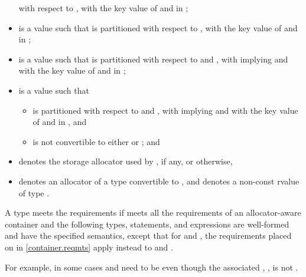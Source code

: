 \begin{itemize}
with respect to ,
with  the key value of  and  in ;
\item
{} is a value such that  is partitioned with respect to
,
with  the key value of  and  in ;
\item
{} is a value such that  is partitioned with respect to
 and , with  implying
 and
with  the key value of  and  in ;
\item
{} is a value such that
\begin{itemize}
\item
{} is partitioned with respect to  and ,
with  implying  and
with  the key value of  and  in , and
\item
{} is not convertible to
either  or ; and
\end{itemize}
\item
{} denotes the storage allocator used by , if any, or  otherwise,
\item
{} denotes an allocator of a type convertible to ,
and  denotes a non-const rvalue of type .
\end{itemize}

\pnum
A type  meets the  requirements
if  meets all the requirements of an allocator-aware
container and
the following types, statements, and expressions are well-formed and
have the specified semantics,
except that for
 and , the requirements placed on 
in \ref{container.reqmts} apply instead to 
and .
\begin{note}
For example, in some cases  and 
need to be  even though the associated
, , is not
.
\end{note}

\newcommand{\indexordmem}[1]{%
\indexlibrary{\idxcode{#1}!ordered associative containers}%
\indexlibrary{\idxcode{set}!\idxcode{#1}}%
\indexlibrary{\idxcode{map}!\idxcode{#1}}%
\indexlibrary{\idxcode{multiset}!\idxcode{#1}}%
\indexlibrary{\idxcode{multimap}!\idxcode{#1}}%
\indexlibrary{\idxcode{flat_set}!\idxcode{#1}}%
\indexlibrary{\idxcode{flat_map}!\idxcode{#1}}%
\indexlibrary{\idxcode{flat_multiset}!\idxcode{#1}}%
\indexlibrary{\idxcode{flat_multimap}!\idxcode{#1}}%
}

